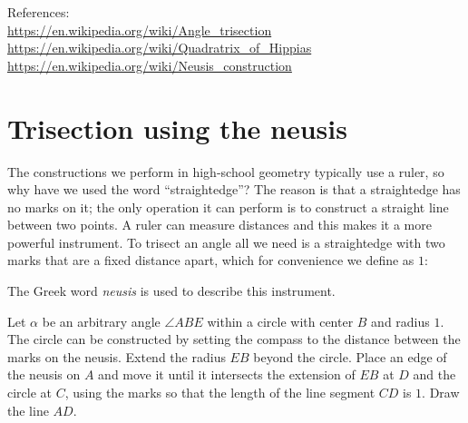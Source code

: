 \documentclass[11pt,a4paper]{article}
\begin{document}
References:\\
\url{https://en.wikipedia.org/wiki/Angle_trisection}\\
\url{https://en.wikipedia.org/wiki/Quadratrix_of_Hippias}\\
\url{https://en.wikipedia.org/wiki/Neusis_construction}

\newpage


\section{Trisection using the neusis}\label{s.neusis}

The constructions we perform in high-school geometry typically use a ruler, so why have we used the word ``straightedge''? The reason is that a straightedge has no marks on it; the only operation it can perform is to construct a straight line between two points. A ruler can measure distances and this makes it a more powerful instrument. To trisect an angle all we need is a straightedge with two marks that are a fixed distance apart, which for convenience we define as $1$:
\begin{center}
\end{center}
The Greek word \emph{neusis} is used to describe this instrument.

Let $\alpha$ be an arbitrary angle $\angle ABE$ within a circle with center $B$ and radius $1$. The circle can be constructed by setting the compass to the distance between the marks on the neusis. Extend the radius $EB$ beyond the circle. Place an edge of the neusis on $A$ and move it until it intersects the extension of $EB$ at $D$ and the circle at $C$, using the marks so that the length of the line segment $CD$ is $1$. Draw the line $AD$.
\end{document}
